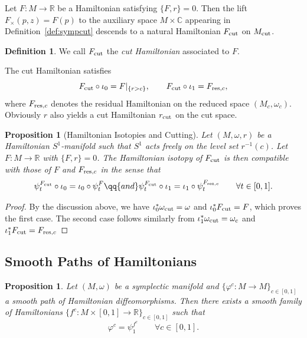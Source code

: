 \documentclass[10pt,oneside,reqno]{amsart}
\newtheorem{proposition}[theorem]{Proposition}
\theoremstyle{definition}
\newtheorem{definition}[theorem]{Definition}
\newcommand{\C}{\mathbb{C}}
\newcommand{\resc}{{\textup{res},c}}
\newcommand{\cut}{\textup{cut}}
\begin{document}
Let $F:M\to\mathbb{R}$ be a Hamiltonian satisfying $\{F,r\}=0$. Then the lift $F_{\times}(p,z) = F(p)$ to the auxiliary space $M\times \C$ appearing in Definition~\ref{def:sympcut} descends to a natural Hamiltonian $F_\cut$ on $M_\cut$.
\begin{definition}
    \label{def:cuthamiltonian}
    We call $F_\cut$ the \emph{cut Hamiltonian} associated to $F$.
\end{definition}
The cut Hamiltonian satisfies 
\[
F_\cut\circ\iota_0 = F|_{\{r>c\}}, \qquad
F_\cut\circ\iota_1 = F_\resc,
\]
where $F_\resc$ denotes the residual Hamiltonian on the reduced space $(M_c,\omega_c)$. Obviously $r$ also yields a cut Hamiltonian $r_\cut$ on the cut space.

\begin{proposition}[Hamiltonian Isotopies and Cutting]
\label{prop:cuttingham}
Let $(M,\omega,r)$ be a Hamiltonian $S^1$-manifold such that $S^1$ acts freely on the level set $r^{-1}(c)$. Let $F:M\to\mathbb{R}$ with $\{F,r\}=0$. The Hamiltonian isotopy of $F_\cut$ is then compatible with those of $F$ and $F_\resc$ in the sense that 
    \begin{equation*}
        \psi_t^{F_\cut} \circ \iota_0 =\iota_0 \circ \psi_t^F  \qq{and} \psi_t^{F_\cut} \circ \iota_1=\iota_1 \circ \psi^{F_\resc}_t  \qquad \forall t\in [0,1].
    \end{equation*}
\end{proposition}

\begin{proof}
By the discussion above, we have $\iota_0^* \omega_\cut = \omega$ and $\iota_0^*F_\cut = F$, which proves the first case. The second case follows similarly from $\iota_1^* \omega_\cut = \omega_c$ and $\iota_1^* F_\cut = F_\resc$
\end{proof}

\subsection{Smooth Paths of Hamiltonians}
\begin{proposition}\label{prop:reparametrisation}
Let $(M,\omega)$ be a symplectic manifold and 
$\{\varphi^c:M\to M\}_{c\in[0,1]}$ a smooth path of Hamiltonian
diffeomorphisms. Then there exists a smooth family of Hamiltonians
$\{f^c:M\times[0,1]\to\mathbb{R}\}_{c\in[0,1]}$ such that
\begin{equation*}
\varphi^c = \psi^{f^c}_1 \qquad \forall c\in[0,1].
\end{equation*}
\end{proposition}
\end{document}
